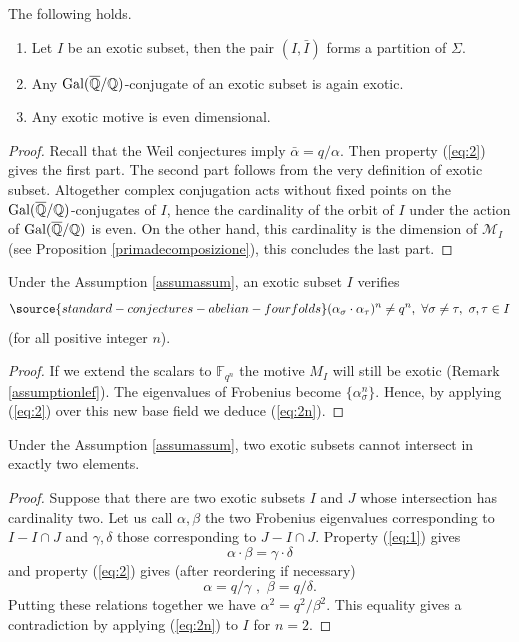 \begin{lemma}
\notready\label{lemmaeven} The following holds.
\begin{enumerate}
\item\label{partizione} Let $I$ be an exotic subset, then the pair $(I,\bar{I})$ forms a partition of $\Sigma$.
\item Any  $\textnormal{Gal}(\overline{\mathbb{Q}}/\mathbb{Q})$-conjugate of an exotic subset is again exotic.
\item Any exotic motive is even dimensional.
  \end{enumerate}
\end{lemma}
\begin{proof}
 Recall that the Weil conjectures imply $\bar{\alpha}=q/\alpha$.
Then property (\ref{eq:2}) gives the first part. The second part follows from the very definition of exotic subset.
Altogether complex conjugation acts without fixed points on  the $\textnormal{Gal}(\overline{\mathbb{Q}}/\mathbb{Q})$-conjugates of $I$, hence the cardinality of the orbit of $I$ under the action of   $\textnormal{Gal}(\overline{\mathbb{Q}}/\mathbb{Q})$ is even. On the other hand, this cardinality is the dimension of $\mathcal{M}_I$  (see  Proposition \ref{primadecomposizione}), this concludes the last part.
\end{proof}

\begin{lemma}
\notready
\label{lemma:exotic-power}
Under the Assumption \ref{assumassum}, an exotic subset $I$ verifies
\begin{equation} \label{eq:2n}
\source{standard-conjectures-abelian-fourfolds}
(\alpha_\sigma \cdot \alpha_\tau)^n \neq q^n, \, \, \forall \sigma \neq \tau, \,\, \sigma,\tau \in I
\end{equation}
(for all positive integer $n$).
\end{lemma}
\begin{proof}
 If we extend the scalars to  $\mathbb{F}_{q^n}$  the motive $M_I$  will still be exotic (Remark \ref{assumptionlef}).  The eigenvalues of  Frobenius become $\{\alpha_\sigma^n\}$. Hence, by applying  (\ref{eq:2}) over this new base field we deduce (\ref{eq:2n}).
\end{proof}
\begin{lemma}
\notready\label{lemmanotwo}
Under the Assumption \ref{assumassum}, two exotic subsets cannot intersect in exactly two elements.
\end{lemma}
\begin{proof}
 Suppose that there are two exotic subsets  $I$ and $J$ whose intersection has cardinality two. Let us call $\alpha,\beta$ the two Frobenius eigenvalues corresponding to  $I-I\cap J$ and $\gamma,\delta$  those corresponding to  $J-I\cap J$.  Property (\ref{eq:1})  gives
 \[\alpha\cdot \beta=\gamma \cdot  \delta\]
and  property (\ref{eq:2}) gives (after reordering if necessary)
\[\alpha= q/ \gamma \,\, , \,\, \beta=  q/\delta.\]
Putting these relations together we have
$\alpha^2 =q^2/\beta^2.$ This equality gives a contradiction by applying   (\ref{eq:2n})   to $I$ for $n=2$.
\end{proof}



